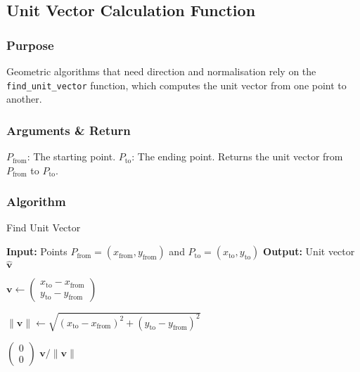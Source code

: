 \documentclass[12pt,a4paper]{report}
\begin{document}
\subsection{Unit Vector Calculation Function}

\subsubsection{Purpose}
Geometric algorithms that need direction and normalisation rely on the \texttt{find\_unit\_vector} function, which computes the unit vector from one point to another.

\subsubsection{Arguments \& Return}
$P_{\text{from}}$: The starting point. $P_{\text{to}}$: The ending point. Returns the unit vector from $P_{\text{from}}$ to $P_{\text{to}}$.


\subsubsection{Algorithm}
\begin{algorithm}
\caption{Find Unit Vector}
\begin{algorithmic}[1]
\State \textbf{Input:} Points \( P_{\text{from}} = (x_{\text{from}}, y_{\text{from}}) \) and \( P_{\text{to}} = (x_{\text{to}}, y_{\text{to}}) \)
\State \textbf{Output:} Unit vector \( \hat{\mathbf{v}} \)

\State \( \mathbf{v} \gets \begin{pmatrix} x_{\text{to}} - x_{\text{from}} \\ y_{\text{to}} - y_{\text{from}} \end{pmatrix} \)

\State \( \|\mathbf{v}\| \gets \sqrt{(x_{\text{to}} - x_{\text{from}})^2 + (y_{\text{to}} - y_{\text{from}})^2} \)

    \State \Return \( \begin{pmatrix} 0 \\ 0 \end{pmatrix} \)
\Else
    \State \Return \( \mathbf{v} / \|\mathbf{v}\| \)
\EndIf

\end{algorithmic}
\end{algorithm}
\end{document}
